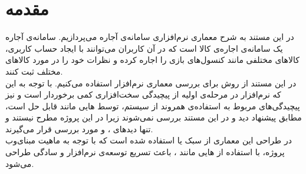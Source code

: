 \section*{مقدمه}
در این مستند به شرح معماری نرم‌افزاری سامانه‌ی آجاره می‌پردازیم. سامانه‌ی آجاره یک سامانه‌ی اجاره‌ی کالا است که در آن کاربران می‌توانند با ایجاد حساب کاربری، کالاهای مختلفی مانند کنسول‌های بازی را اجاره کرده و نظرات خود را در مورد کالاهای مختلف ثبت کنند. \\
در این مستند از روش 
برای بررسی معماری نرم‌افزار استفاده می‌کنیم. با توجه به این که نرم‌افزار در مرحله‌ی اولیه‌  از پیچیدگی سخت‌افزاری کمی برخوردار است و نیز  پیچیدگی‌های مربوط به استفاده‌ی همروند از سیستم، توسط 
‌هایی
مانند
قابل حل است، مطابق پیشنهاد
 
دید
و
در این مستند بررسی نمی‌شوند زیرا در این پروژه مطرح نیستند و تنها دید‌های
،
و
مورد بررسی قرار می‌گیرند.\\
در طراحی این معماری از سبک 
یا 
استفاده شده است که با توجه به ماهیت مبنای‌وب پروژه، با استفاده از ‌هایی مانند 
، 
باعث تسریع توسعه‌ی نرم‌افزار و سادگی طراحی می‌شود.\\